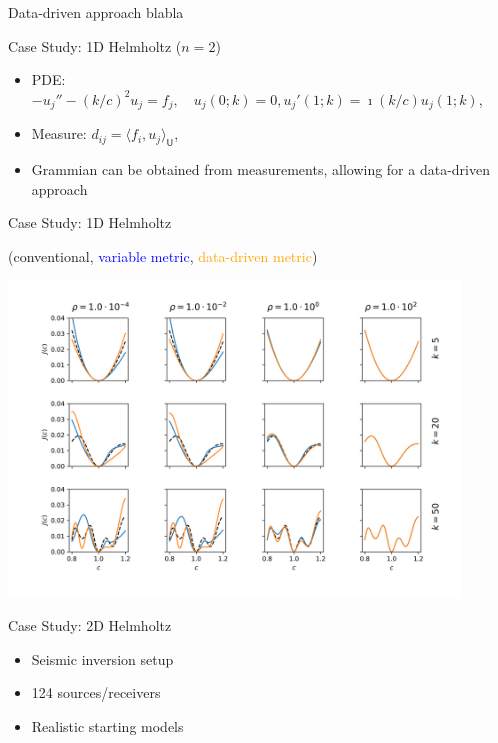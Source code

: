 \documentclass{beamer}
\newcommand{\sU}{\mathsf{U}}
\begin{document}
\begin{frame}{Data-driven approach}
blabla
\end{frame}

\begin{frame}{Case Study: 1D Helmholtz ($n=2$)}
\begin{itemize}
  \item PDE: $-u_j'' - (k/c)^2 u_j = f_j, \quad u_j(0;k) = 0, u_j'(1;k)=\imath (k/c)u_j(1;k)$,
  \item Measure: $d_{ij} = \langle f_i, u_j\rangle_\sU$,
  \item Grammian can be obtained from measurements, allowing for a data-driven approach
\end{itemize}
\end{frame}

\begin{frame}{Case Study: 1D Helmholtz}

  \begin{center}
(conventional, \textcolor{blue}{variable metric}, \textcolor{orange}{data-driven metric})
  \end{center}
\includegraphics[width=0.9\textwidth]{../paper/figures/Helmholtz1D_2.png}
\end{frame}

\begin{frame}{Case Study: 2D Helmholtz}
\begin{itemize}
  \item Seismic inversion setup
  \item 124 sources/receivers
  \item Realistic starting models
\end{itemize}
\end{frame}
\end{document}
